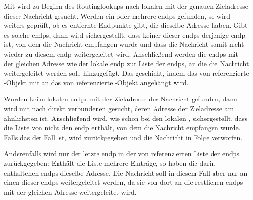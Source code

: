 Mit  wird zu Beginn des Routinglookups
nach lokalen  mit der genauen Zieladresse dieser Nachricht gesucht.
Werden ein oder mehrere \glspl{endp} gefunden, so wird weiters geprüft, ob es entfernte Endpunkte
gibt, die dieselbe Adresse haben. Gibt es solche \glspl{endp}, dann wird sichergestellt, dass
keiner dieser \glspl{endp} derjenige \gls{endp} ist, von dem die Nachricht empfangen wurde und
dass die Nachricht somit nicht wieder zu diesem \gls{endp} weitergeleitet wird.
Anschließend werden die \glspl{endp} mit der gleichen Adresse wie der lokale \gls{endp} zur Liste
der \glspl{endp}, an die die Nachricht weitergeleitet werden soll, hinzugefügt.
Das geschieht, indem das von  referenzierte -Objekt
mit  an das von  referenzierte
-Objekt angehängt wird.

Wurden keine lokalen \glspl{endp} mit der Zieladresse der Nachricht gefunden, dann wird mit
 nach direkt verbundenen
 gesucht, deren Adresse der Zieladresse am ähnlichsten ist.
Anschließend wird, wie schon bei den lokalen , sichergestellt,
dass die Liste von  nicht den \gls{endp} enthält, von
dem die Nachricht empfangen wurde.
Falls das der Fall ist, wird  zurückgegeben und die Nachricht in Folge verworfen.

Anderenfalls wird nur der letzte \gls{endp} in der von  referenzierten
Liste der \glspl{endp} zurückgegeben: Enthält die Liste mehrere Einträge, so haben die darin
enthaltenen \glspl{endp} dieselbe Adresse. Die Nachricht soll in diesem Fall aber nur an einen
dieser \glspl{endp} weitergeleitet werden, da sie von dort an die restlichen \glspl{endp} mit der
gleichen Adresse weitergeleitet wird.
